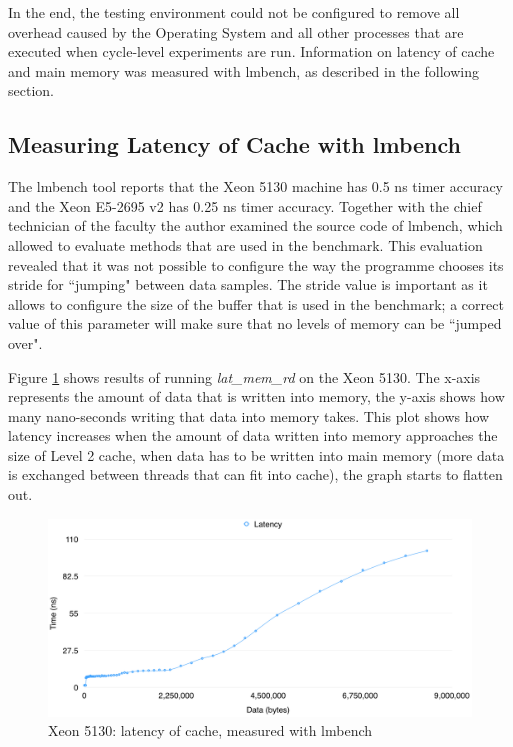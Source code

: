 In the end, the testing environment could not be configured to remove all overhead caused by the Operating System and all other processes that are executed when cycle-level experiments are run. Information on latency of cache and main memory was measured with lmbench, as described in the following section.

\subsection{Measuring Latency of Cache with lmbench}
\label{results_lmbench}

The lmbench tool reports that the Xeon 5130 machine has 0.5 ns timer accuracy and the Xeon E5-2695 v2 has 0.25 ns timer accuracy. Together with the chief technician of the faculty the author examined the source code of lmbench, which allowed to evaluate methods that are used in the benchmark. This evaluation revealed that it was not possible to configure the way the programme chooses its stride for ``jumping" between data samples. The stride value is important as it allows to configure the size of the buffer that is used in the benchmark; a correct value of this parameter will make sure that no levels of memory can be ``jumped over".

Figure \ref{lmbench_nuim} shows results of running \textit{lat\_mem\_rd} on the Xeon 5130. The x-axis represents the amount of data that is written into memory, the y-axis shows how many nano-seconds writing that data into memory takes. This plot shows how latency increases when the amount of data written into memory approaches the size of Level 2 cache, when data has to be written into main memory (more data is exchanged between threads that can fit into cache), the graph starts to flatten out.

\begin{figure}[!htb]
\centering
\includegraphics[width=145mm]{6/lmbench_nuim.png}
\caption{Xeon 5130: latency of cache, measured with lmbench}
\label{lmbench_nuim}
\end{figure}

